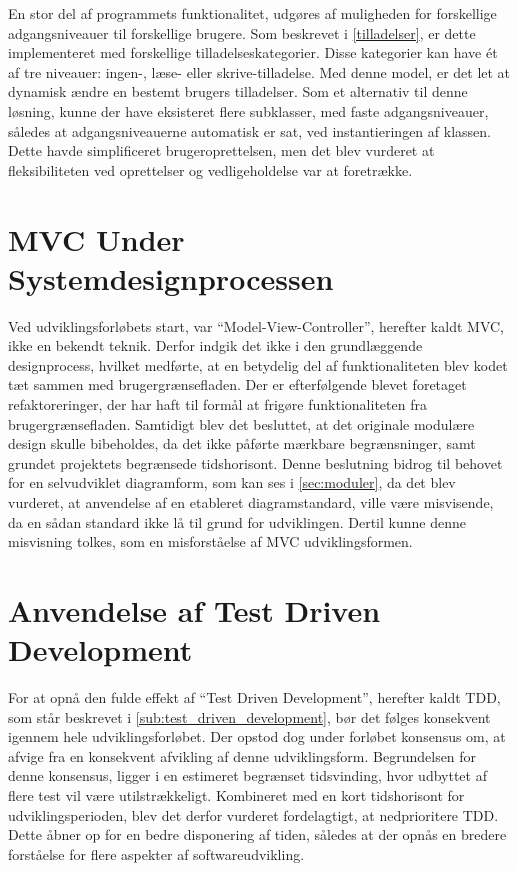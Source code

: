 En stor del af programmets funktionalitet, udgøres af muligheden for forskellige adgangsniveauer til forskellige brugere. Som beskrevet i \cref{tilladelser}, er dette implementeret med forskellige tilladelseskategorier. Disse kategorier kan have ét af tre niveauer: ingen-, læse- eller skrive-tilladelse. Med denne model, er det let at dynamisk ændre en bestemt brugers tilladelser. Som et alternativ til denne løsning, kunne der have eksisteret flere subklasser, med faste adgangsniveauer, således at adgangsniveauerne automatisk er sat, ved instantieringen af klassen. Dette havde simplificeret brugeroprettelsen, men det blev vurderet at fleksibiliteten ved oprettelser og vedligeholdelse var at foretrække.

\section{MVC Under Systemdesignprocessen}

Ved udviklingsforløbets start, var \enquote{Model-View-Controller}, herefter kaldt MVC, ikke en bekendt teknik. Derfor indgik det ikke i den grundlæggende designprocess, hvilket medførte, at en betydelig del af funktionaliteten blev kodet tæt sammen med brugergrænsefladen. Der er efterfølgende blevet foretaget refaktoreringer, der har haft til formål at frigøre funktionaliteten fra brugergrænsefladen. Samtidigt blev det besluttet, at det originale modulære design skulle bibeholdes, da det ikke påførte mærkbare begrænsninger, samt grundet projektets begrænsede tidshorisont. Denne beslutning bidrog til behovet for en selvudviklet diagramform, som kan ses i \cref{sec:moduler}, da det blev vurderet, at anvendelse af en etableret diagramstandard, ville være misvisende, da en sådan standard ikke lå til grund for udviklingen. Dertil kunne denne misvisning tolkes, som en misforståelse af MVC udviklingsformen.

\section{Anvendelse af Test Driven Development}

For at opnå den fulde effekt af \enquote{Test Driven Development}, herefter kaldt TDD, som står beskrevet i \cref{sub:test_driven_development}, bør det følges konsekvent igennem hele udviklingsforløbet. Der opstod dog under forløbet konsensus om, at afvige fra en konsekvent afvikling af denne udviklingsform. Begrundelsen for denne konsensus, ligger i en estimeret begrænset tidsvinding, hvor udbyttet af flere test vil være utilstrækkeligt. Kombineret med en kort tidshorisont for udviklingsperioden, blev det derfor vurderet fordelagtigt, at nedprioritere TDD. Dette åbner op for en bedre disponering af tiden, således at der opnås en bredere forståelse for flere aspekter af softwareudvikling.

